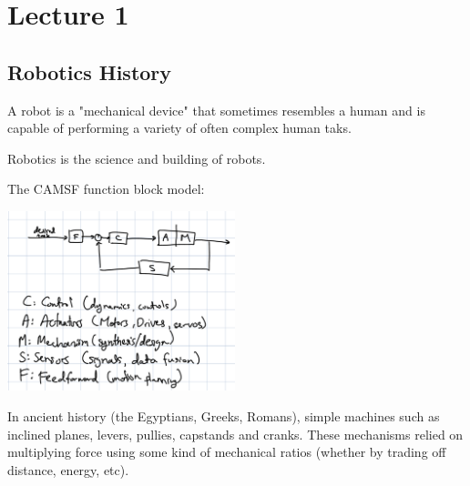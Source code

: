\section{Lecture 1}

\subsection{Robotics History}

\begin{definition}
    A robot is a "mechanical device" that sometimes resembles a human and is capable of performing a variety of often complex human taks.

    Robotics is the science and building of robots.
\end{definition}

The CAMSF function block model:

\includegraphics[width=250px]{../images/blockorigin.jpeg}

In ancient history (the Egyptians, Greeks, Romans), simple machines such as inclined planes, levers, pullies, capstands and cranks. These mechanisms
relied on multiplying force using some kind of mechanical ratios (whether by trading off distance, energy, etc).